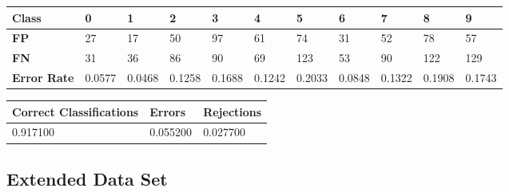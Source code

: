 \documentclass[
  a4paper,            %
  DIV=10,             %
  oneside,            %
  BCOR=5mm,           %
  parskip=half,       %
  numbers=noenddot,   %
  bibtotoc,           %
  listof=totoc,        %
  article
]{scrreprt}
\begin{document}
\begin{center}
  \begin{tabular}{|p{1cm}|p{1cm}|p{1cm}|p{1cm}|p{1cm}|p{1cm}|p{1cm}|p{1cm}|p{1cm}|p{1cm}|p{1cm}|}
    \hline
    \textbf{Class} & \textbf{0} & \textbf{1} & \textbf{2} & \textbf{3} & \textbf{4} & \textbf{5} & \textbf{6} & \textbf{7} & \textbf{8} & \textbf{9} \\
    \hline
    \textbf{FP} & 27 & 17 & 50 & 97 & 61 & 74 & 31 & 52 & 78 & 57 \\
    \hline
    \textbf{FN} & 31 & 36 & 86 & 90 & 69 & 123 & 53 & 90 & 122 & 129 \\
    \hline
    \textbf{Error Rate} & 0.0577 & 0.0468 & 0.1258 & 0.1688 & 0.1242 & 0.2033 & 0.0848 & 0.1322 & 0.1908 & 0.1743 \\
    \hline
  \end{tabular}
\end{center}

\begin{center}
  \begin{tabular}{|p{5cm}|p{3cm}|p{3cm}|}
    \hline
    \textbf{Correct Classifications} & \textbf{Errors} & \textbf{Rejections} \\
    \hline
    0.917100 & 0.055200 & 0.027700 \\
    \hline
  \end{tabular}
\end{center}
\subsection{Extended Data Set}
\end{document}
